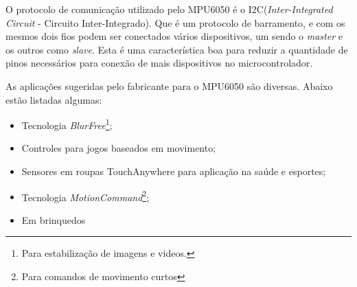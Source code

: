 	O protocolo de comunicação utilizado pelo MPU6050 é o I2C(\textit{Inter-Integrated Circuit} - Circuito Inter-Integrado). Que é um protocolo de barramento, e com os mesmos dois fios podem ser conectados vários dispositivos, um sendo o \textit{master} e os outros como \textit{slave}. Esta é uma característica boa para reduzir a quantidade de pinos necessários para conexão de mais dispositivos no microcontrolador.\cite{mpu6050}
	
	As aplicações sugeridas pelo fabricante para o MPU6050 são diversas. Abaixo estão listadas algumas:
	\begin{itemize}
		\item Tecnologia \textit{ BlurFree\texttrademark }\footnote{Para estabilização de imagens e videos.};
		\item Controles para jogos baseados em movimento;
		\item Sensores em roupas TouchAnywhere para aplicação na saúde e esportes;
		\item Tecnologia \textit{ MotionCommand\texttrademark}\footnote{Para comandos de movimento curtos}; 
		\item Em brinquedos
	\end{itemize}
	
